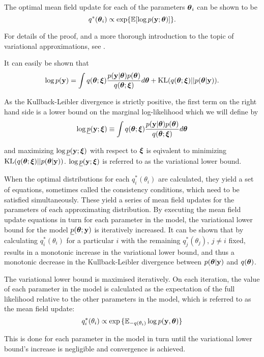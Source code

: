 The optimal mean field update for each of the parameters ${\boldsymbol \theta}_i$ can be shown to be
\[
	q^*({\boldsymbol \theta}_i) \propto \exp \{ \mathbb{E} [\log p({\bf y}; {\boldsymbol \theta})] \}.
\]

For details of the proof, and a more thorough introduction to the topic of variational approximations, see
\cite{Ormerod2010}.

\noindent It can easily be shown that
\[
	\displaystyle \log p({\bf y}) = \int q({\boldsymbol \theta};{\boldsymbol \xi})\frac{p({\bf y}|{\boldsymbol \theta})p({\boldsymbol \theta})}{q({\boldsymbol \theta};{\boldsymbol \xi})} d{\boldsymbol \theta} + \text{KL}(q({\boldsymbol \theta};{\boldsymbol \xi})||p({\boldsymbol \theta}|{\bf y})).
\]

\noindent As the Kullback-Leibler divergence is strictly positive, the first term on the right hand side
is a lower bound on the marginal log-likelihood which we will define by
$$
\displaystyle \log \underline{p}({\bf y};{\boldsymbol \xi}) \equiv \int q({\boldsymbol \theta};{\boldsymbol \xi})\frac{p({\bf y}|{\boldsymbol \theta})p({\boldsymbol \theta})}{q({\boldsymbol \theta};{\boldsymbol \xi})} d{\boldsymbol \theta}
$$

\noindent and maximizing $\log \underline{p}({\bf y};{\boldsymbol \xi})$ with respect to ${\boldsymbol \xi}$ is eqivalent to minimizing
$\text{KL}(q({\boldsymbol \theta};{\boldsymbol \xi})||p({\boldsymbol \theta}|{\bf y}))$. $\log \underline{p}({\bf y};{\boldsymbol \xi})$ is referred to as the
variational lower bound.

\noindent When the optimal distributions for each $q_i^*(\theta_i)$ are calculated, they yield a set of
equations, sometimes called the consistency conditions, which need to be  satisfied simultaneously. These
yield a series of mean field updates for the parameters of each approximating distribution. By executing the
mean field update equations in turn for each parameter in the model, the variational lower bound for the model
$\underline{p}({\boldsymbol \theta}; {\bf y})$ is iteratively increased. It can be shown that by calculating $q_i^*(\theta_i)$ for 
a particular $i$ with the remaining $q_j^*(\theta_j)$, $j\ne i$ fixed, results in a monotonic increase in the
variational lower bound, and thus a monotonic decrease in the Kullback-Leibler divergence between
$p({\boldsymbol \theta}|{\bf y})$ and $q({\boldsymbol \theta})$.

\noindent The variational lower bound is maximised iteratively. On each iteration, the value of each parameter
in the model is calculated as the expectation of the full likelihood relative to the other parameters in the
model, which is referred to as the mean field update:
$$q_i^*(\theta_i) \propto \exp{\{ {\mathbb E}_{-q(\theta_i)} \log p({\bf y}, {\boldsymbol\theta}) \}}$$

\noindent This is done for each parameter in the model in turn until the variational lower bound's increase is
negligible and convergence is achieved.

